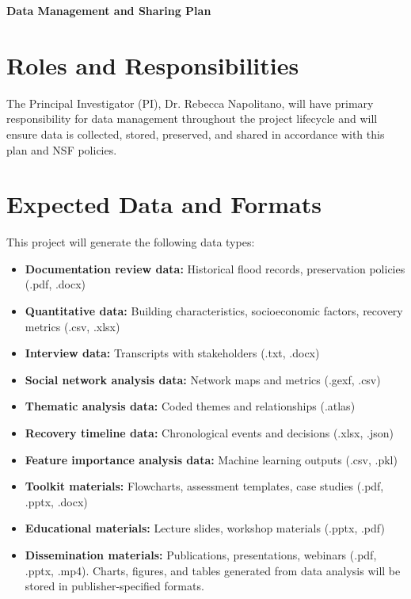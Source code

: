 \documentclass[11pt]{article}
\begin{document}
%
\pagestyle{empty} 

\noindent \textbf{Data Management and Sharing Plan}
\vspace{0.3cm}
\section{Roles and Responsibilities}
The Principal Investigator (PI), Dr. Rebecca Napolitano, will have primary responsibility for data management throughout the project lifecycle and will ensure data is collected, stored, preserved, and shared in accordance with this plan and NSF policies.

\vspace{0.3cm}
\section{Expected Data and Formats}
This project will generate the following data types:

\begin{itemize}%
\item[] \textbf{Documentation review data:} Historical flood records, preservation policies (.pdf, .docx) 
\item[] \textbf{Quantitative data:} Building characteristics, socioeconomic factors, recovery metrics (.csv, .xlsx) 
\item[] \textbf{Interview data:} Transcripts with stakeholders (.txt, .docx) 
\item[] \textbf{Social network analysis data:} Network maps and metrics (.gexf, .csv) 
\item[] \textbf{Thematic analysis data:} Coded themes and relationships (.atlas) 
\item[] \textbf{Recovery timeline data:} Chronological events and decisions (.xlsx, .json) 
\item[] \textbf{Feature importance analysis data:} Machine learning outputs (.csv, .pkl) 
\item[] \textbf{Toolkit materials:} Flowcharts, assessment templates, case studies (.pdf, .pptx, .docx) 
\item[] \textbf{Educational materials:} Lecture slides, workshop materials (.pptx, .pdf)
\item[] \textbf{Dissemination materials:} Publications, presentations, webinars (.pdf, .pptx, .mp4). Charts, figures, and tables generated from data analysis will be stored in publisher-specified formats. \end{itemize}
\end{document}
